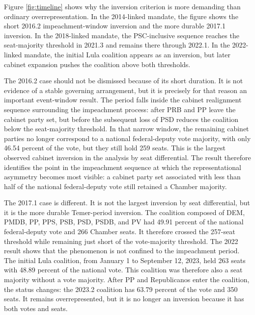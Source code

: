 \documentclass[11pt]{article}
\newcommand{\RepoRoot}{/home/marcelo/Sync/Projects/electoral-inversion}%
\newcommand{\RepoRoot}{/home/marcelovmaciel/Sync/Projects/electoral_inversions}%
\newcommand{\ArtifactRoot}{\RepoRoot/processing/Processing/output/paper}
\begin{document}
\begin{table}[htbp]
\centering
\caption{Observed cabinet-period coalition inversions}
\label{tab:cabinet-inversions}
\footnotesize

\end{table}

Figure \ref{fig:timeline} shows why the inversion criterion is more demanding
than ordinary overrepresentation. In the 2014-linked mandate, the figure shows
the short 2016.2 impeachment-window inversion and the more durable 2017.1
inversion. In the 2018-linked mandate, the PSC-inclusive sequence reaches the
seat-majority threshold in 2021.3 and remains there through 2022.1. In the
2022-linked mandate, the initial Lula coalition appears as an inversion, but
later cabinet expansion pushes the coalition above both thresholds.

The 2016.2 case should not be dismissed because of its short duration. It is
not evidence of a stable governing arrangement, but it is precisely for that
reason an important event-window result. The period falls inside the cabinet
realignment sequence surrounding the impeachment process: after PRB and PP
leave the cabinet party set, but before the subsequent loss of PSD reduces the
coalition below the seat-majority threshold. In that narrow window, the
remaining cabinet parties no longer correspond to a national federal-deputy
vote majority, with only 46.54 percent of the vote, but they still hold 259
seats. This is the largest observed cabinet inversion in the analysis by seat
differential. The result therefore identifies the point in the impeachment
sequence at which the representational asymmetry becomes most visible: a
cabinet party set associated with less than half of the national federal-deputy
vote still retained a Chamber majority.

The 2017.1 case is different. It is not the largest inversion by seat
differential, but it is the more durable Temer-period inversion. The
coalition composed of DEM, PMDB, PP, PPS, PSB, PSD, PSDB, and PV had 49.91
percent of the national federal-deputy vote and 266 Chamber seats. It therefore
crossed the 257-seat threshold while remaining just short of the vote-majority
threshold.  The 2022 result shows that the phenomenon is not confined to the impeachment
period. The initial Lula coalition, from January 1 to September 12, 2023, held
263 seats with 48.89 percent of the national vote. This coalition was therefore
also a seat majority without a vote majority. After PP and Republicanos enter
the coalition, the status changes: the 2023.2 coalition has 63.79 percent of the
vote and 350 seats. It remains overrepresented, but it is no longer an inversion
because it has both votes and seats.
\end{document}

